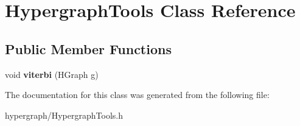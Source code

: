 \hypertarget{class_hypergraph_tools}{
\section{HypergraphTools Class Reference}
\label{class_hypergraph_tools}
}
\subsection*{Public Member Functions}
\begin{DoxyCompactItemize}
\item 
\hypertarget{class_hypergraph_tools_a188643770705ed9482616956e22ebfd4}{
void {\bfseries viterbi} (HGraph g)}
\label{class_hypergraph_tools_a188643770705ed9482616956e22ebfd4}

\end{DoxyCompactItemize}


The documentation for this class was generated from the following file:\begin{DoxyCompactItemize}
\item 
hypergraph/HypergraphTools.h\end{DoxyCompactItemize}
